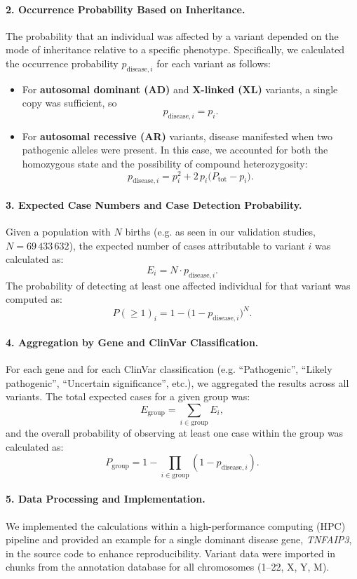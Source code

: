 \paragraph{2. Occurrence Probability Based on Inheritance.}
The probability that an individual was affected by a variant depended on the mode of inheritance relative to a specific phenotype. Specifically, we calculated the occurrence probability \(p_{\text{disease},i}\) for each variant as follows:
\begin{itemize}
    \item For \textbf{autosomal dominant (AD)} and \textbf{X-linked (XL)} variants, a single copy was sufficient, so
    \[
    p_{\text{disease},i} = p_i.
    \]
    \item For \textbf{autosomal recessive (AR)} variants, disease manifested when two pathogenic alleles were present. In this case, we accounted for both the homozygous state and the possibility of compound heterozygosity:
    \[
    p_{\text{disease},i} = p_i^2 + 2\,p_i\bigl(P_{\text{tot}} - p_i\bigr).
    \]
\end{itemize}

\paragraph{3. Expected Case Numbers and Case Detection Probability.}
Given a population with \(N\) births (e.g. as seen in our validation studies, \(N = 69\,433\,632\)), the expected number of cases attributable to variant \(i\) was calculated as:
\[
E_i = N \cdot p_{\text{disease},i}.
\]
The probability of detecting at least one affected individual for that variant was computed as:
\[
P(\geq 1)_i = 1 - \bigl(1 - p_{\text{disease},i}\bigr)^N.
\]

\paragraph{4. Aggregation by Gene and ClinVar Classification.}
For each gene and for each ClinVar classification (e.g. “Pathogenic”, “Likely pathogenic”, “Uncertain significance”, etc.), we aggregated the results across all variants. The total expected cases for a given group was:
\[
E_{\text{group}} = \sum_{i \in \text{group}} E_i,
\]
and the overall probability of observing at least one case within the group was calculated as:
\[
P_{\text{group}} = 1 - \prod_{i \in \text{group}} \left(1 - p_{\text{disease},i}\right).
\]

\paragraph{5. Data Processing and Implementation.}
We implemented the calculations within a high-performance computing (HPC) pipeline and provided an example for a single dominant disease gene, \textit{TNFAIP3}, in the source code to enhance reproducibility. Variant data were imported in chunks from the annotation database for all chromosomes (1--22, X, Y, M). 

